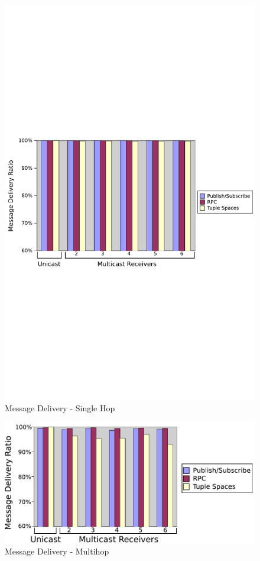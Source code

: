 \begin{figure}
\centering
\includegraphics[width = \textwidth, clip, trim = 0px 400px 0px 400px]{figures/single-hop-group-delivery.pdf}
\caption{Message Delivery - Single Hop}
\label{fig:sgdel}
\end{figure}

\begin{figure}
\centering
\includegraphics[width = \textwidth, clip, trim = 0px 0px 0px 0px]{figures/multi-hop-group-delivery.pdf}
\caption{Message Delivery - Multihop}
\label{fig:mhgdel}
\end{figure}

